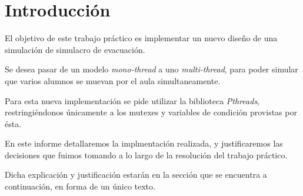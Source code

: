\documentclass[a4paper]{article}
\begin{document}

\thispagestyle{empty}

\maketitle
\newpage

\thispagestyle{empty}
\vfill
\thispagestyle{empty}
\vspace{1.5cm}
\tableofcontents
\newpage


\newpage

\section{Introducción}

El objetivo de este trabajo práctico es implementar un nuevo diseño de una
simulación de simulacro de evacuación.

Se desea pasar de un modelo  \textit{mono-thread} a uno
\textit{multi-thread}, para poder simular que varios alumnos se muevan por
el aula simultaneamente.

Para esta nueva implementación se pide utilizar la biblioteca
\textit{Pthreads}, restringiéndonos únicamente a los mutexes y variables de
condición provistas por ésta.

En este informe detallaremos la implmentación realizada, y justificaremos
las decisiones que fuimos tomando a lo largo de la resolución del trabajo práctico.


Dicha explicación y justificación estarán en la sección que se encuentra a
continuación, en forma de un único texto.



\newpage
\end{document}
